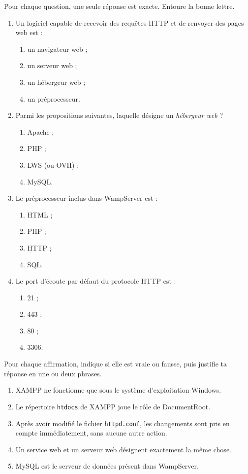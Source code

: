 \documentclass[11pt]{article}
\begin{document}
\begin{exercice}
Pour chaque question, une seule réponse est exacte. Entoure la bonne lettre.

\begin{enumerate}
\item Un logiciel capable de recevoir des requêtes HTTP et de renvoyer des pages web est :
\begin{enumerate}
\item un navigateur web ;
\item un serveur web ;
\item un hébergeur web ;
\item un préprocesseur.
\end{enumerate}
\item Parmi les propositions suivantes, laquelle désigne un \emph{hébergeur web} ?
\begin{enumerate}
\item Apache ;
\item PHP ;
\item LWS (ou OVH) ;
\item MySQL.
\end{enumerate}
\item Le préprocesseur inclus dans WampServer est :
\begin{enumerate}
\item HTML ;
\item PHP ;
\item HTTP ;
\item SQL.
\end{enumerate}
\item Le port d'écoute par défaut du protocole HTTP est :
\begin{enumerate}
\item 21 ;
\item 443 ;
\item 80 ;
\item 3306.
\end{enumerate}
\end{enumerate}
\end{exercice}

\begin{exercice}
Pour chaque affirmation, indique si elle est vraie ou fausse, puis justifie ta réponse en une ou deux phrases.
\begin{enumerate}
\item XAMPP ne fonctionne que sous le système d'exploitation Windows.
\item Le répertoire \texttt{htdocs} de XAMPP joue le rôle de DocumentRoot.
\item Après avoir modifié le fichier \texttt{httpd.conf}, les changements sont pris en compte immédiatement, sans aucune autre action.
\item Un service web et un serveur web désignent exactement la même chose.
\item MySQL est le serveur de données présent dans WampServer.
\end{enumerate}
\end{exercice}
\end{document}
